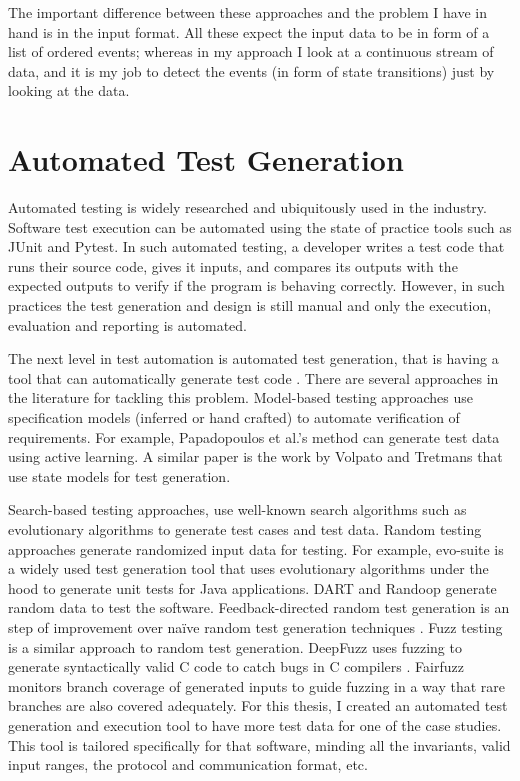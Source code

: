 The important difference between these approaches and the problem I have in hand is in the input format. All these expect the input data to be in form of a list of ordered events; whereas in my approach I look at a continuous stream of data, and it is my job to detect the events (in form of state transitions) just by looking at the data.

\section{Automated Test Generation}
Automated testing is widely researched and ubiquitously used in the industry. 
Software test execution can be automated using the state of practice tools such as JUnit and Pytest. In such automated testing, a developer writes a test code that runs their source code, gives it inputs, and compares its outputs with the expected outputs to verify if the program is behaving correctly. However, in such practices the test generation and design is still manual and only the execution, evaluation and reporting is automated. 

The next level in test automation is automated test generation, that is having a tool that can automatically generate test code \cite{ibrahim2007automatic}. 
There are several approaches in the literature for tackling this problem. 
Model-based testing approaches use specification models (inferred or hand crafted) to automate verification of requirements. For example, Papadopoulos et al.'s method \cite{Papadopoulos2015} can generate test data using active learning. A similar paper is the work by Volpato and Tretmans \cite{volpato2014active} that use state models for test generation. 

Search-based testing approaches, use well-known search algorithms such as evolutionary algorithms to generate test cases and test data. Random testing approaches generate randomized input data for testing.
For example, evo-suite is a widely used test generation tool that uses evolutionary algorithms under the hood \cite{fraser2011evosuite} to generate unit tests for Java applications. DART and Randoop \cite{Godefroid2005DART, pacheco2007randoop} generate random data to test the software. Feedback-directed random test generation is an step of improvement over naïve random test generation techniques \cite{pacheco2007feedback}.
Fuzz testing is a similar approach to random test generation. DeepFuzz uses fuzzing to generate syntactically valid C code to catch bugs in C compilers \cite{liu2019deepfuzz}. Fairfuzz \cite{lemieux2018fairfuzz} monitors branch coverage of generated inputs to guide fuzzing in a way that rare branches are also covered adequately.
For this thesis, I created an automated test generation and execution tool to have more test data for one of the case studies. This tool is tailored specifically for that software, minding all the invariants, valid input ranges, the protocol and communication format, etc.


